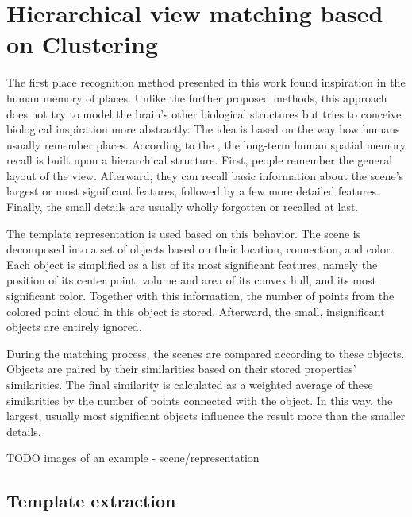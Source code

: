\section{Hierarchical view matching based on Clustering}\label{section:hierarchical}

The first place recognition method presented in this work found inspiration in the human memory of places. Unlike the further proposed methods, this approach does not try to model the brain's other biological structures but tries to conceive biological inspiration more abstractly. The idea is based on the way how humans usually remember places. According to the \cite{memoryHier}, the long-term human spatial memory recall is built upon a hierarchical structure. First, people remember the general layout of the view. Afterward, they can recall basic information about the scene's largest or most significant features, followed by a few more detailed features. Finally, the small details are usually wholly forgotten or recalled at last.\par
The template representation is used based on this behavior. The scene is decomposed into a set of objects based on their location, connection, and color. Each object is simplified as a list of its most significant features, namely the position of its center point, volume and area of its convex hull, and its most significant color. Together with this information, the number of points from the colored point cloud in this object is stored. Afterward, the small, insignificant objects are entirely ignored.\par
During the matching process, the scenes are compared according to these objects. Objects are paired by their similarities based on their stored properties' similarities. The final similarity is calculated as a weighted average of these similarities by the number of points connected with the object. In this way, the largest, usually most significant objects influence the result more than the smaller details.\par

TODO images of an example - scene/representation

\subsection{Template extraction}

